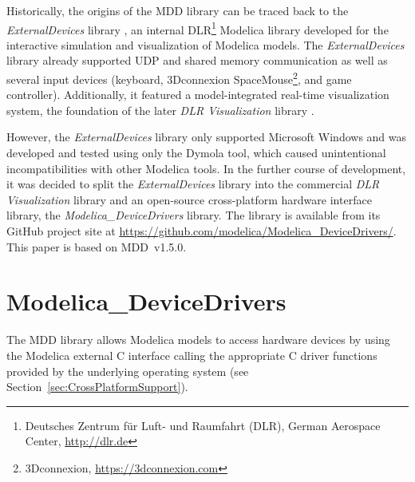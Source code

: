 \documentclass{resources/modelica}
\newcommand{\BTHI}[1]{}
\begin{document}
Historically, the origins of the MDD library can be traced back to the
\emph{ExternalDevices} library \citep{Bellmann2009}, an internal
DLR\footnote{Deutsches Zentrum für Luft- und Raumfahrt (DLR), German Aerospace
Center, \url{http://dlr.de}} Modelica library developed for the interactive
simulation and visualization of Modelica models. The \emph{ExternalDevices}
library already supported UDP and shared memory communication
as well as several input devices (keyboard, 3Dconnexion
SpaceMouse\footnote{3Dconnexion, \url{https://3dconnexion.com}}, and game
controller). Additionally, it featured a model-integrated real-time
visualization system, the foundation of the later \emph{DLR Visualization} library \citep{Hellerer2014}.

However, the \emph{ExternalDevices} library only supported
Microsoft Windows and was developed and tested using only the Dymola tool,
which caused unintentional incompatibilities with other Modelica tools.
In the further course of
development, it was decided to split the \emph{ExternalDevices} library into the
commercial \emph{DLR Visualization} library and an open-source cross-platform hardware
interface library, the \emph{Modelica\_DeviceDrivers} library. The library is
available from its GitHub project site at
\url{https://github.com/modelica/Modelica_DeviceDrivers/}.
This paper is based on MDD~v1.5.0.




\section{Modelica\_DeviceDrivers}
\label{ModelicaDeviceDrivers}
\BTHI{TODO: Bernhard, Thomas, Volker}

The MDD library allows Modelica models to access hardware devices by using the Modelica external C interface calling the appropriate C driver functions provided by the underlying operating system (see
Section~\ref{sec:CrossPlatformSupport}).
\end{document}
